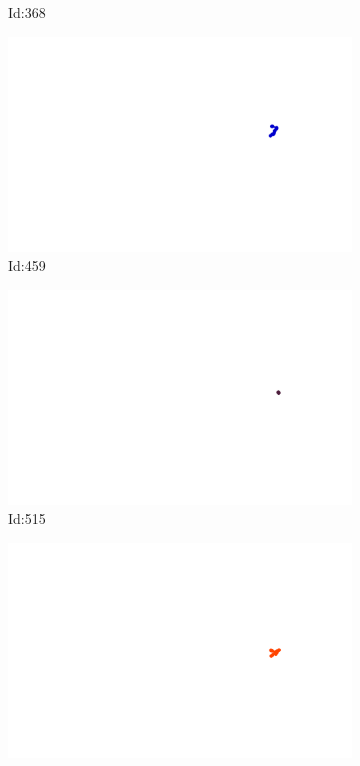 \documentclass[12pt,twoside]{report}
\begin{document}
\begin{figure}
\begin{subfigure}[b]{0.20\textwidth}
\caption{Id:368}
\end{subfigure}
\begin{subfigure}[b]{0.20\textwidth}
\centering
\includegraphics[width=\textwidth]{../../trajectories/459.png}
\caption{Id:459}
\end{subfigure}
\begin{subfigure}[b]{0.20\textwidth}
\centering
\includegraphics[width=\textwidth]{../../trajectories/515.png}
\caption{Id:515}
\end{subfigure}
\begin{subfigure}[b]{0.20\textwidth}
\centering
\includegraphics[width=\textwidth]{../../trajectories/807.png}

\end{subfigure}
\end{figure}
\end{document}
